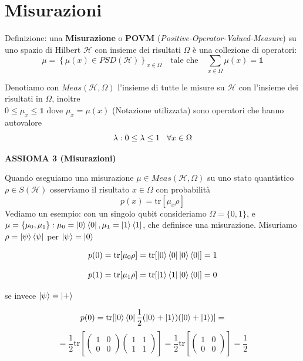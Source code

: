 \documentclass{report}
\begin{document}
\section{Misurazioni}
Definizione: una \textbf{Misurazione} o \textbf{POVM} (\textit{Positive-Operator-Valued-Measure}) su uno spazio di Hilbert $\mathcal{H}$ con insieme dei risultati $\Omega$ è una collezione di operatori:
$$\mu=\left\{ \mu(x) \in \textit{PSD}(\mathcal{H}) \right\}_{x\in\Omega}\quad \text{tale che}\quad \sum_{x\in\Omega} \mu(x) = \mathbb{1}$$

Denotiamo con $\textit{Meas}(\mathcal{H},\Omega)$ l'insieme di tutte le misure su $\mathcal{H}$ con l'insieme dei risultati in $\Omega$, inoltre\\ $0\le\mu_x\le\mathbb{1}$ dove $\mu_x=\mu(x)$ 
(Notazione utilizzata) sono operatori che hanno autovalore $$\lambda:0\le\lambda\le1 \hspace{0.3cm} \forall x \in \Omega$$

\textbf{ASSIOMA 3 (Misurazioni)}

Quando eseguiamo una misurazione $\mu\in \textit{Meas}(\mathcal{H},\Omega)$ su uno stato quantistico $\rho\in S(\mathcal{H})$ osserviamo il risultato $x\in \Omega$ con probabilità $$p(x) = \text{tr}[\mu_x\rho]$$
Vediamo un esempio: con un singolo qubit consideriamo $\Omega= \{0,1\}$, e
$\mu=\{\mu_0,\mu_1\}:\mu_0=\ket{0}\bra{0},\mu_1=\ket{1}\bra{1}$, che definisce una misurazione. Misuriamo $\rho = \ket{\psi}\bra{\psi}$ per $\ket{\psi} = \ket{0}$

$$
    p(0)=\text{tr}[\mu_0\rho]=\text{tr}[\ket{0}\bra{0}\ket{0}\bra{0}] = 1
$$

$$
    p(1)=\text{tr}[\mu_1\rho]=\text{tr}[\ket{1}\bra{1}\ket{0}\bra{0}] = 0
$$

se invece $\ket{\psi} = \ket{+}$

$$
    p(0) = \text{tr}[\ket{0}\bra{0}\frac{1}{2}(\ket{0}+\ket{1})(\ket{0}+\ket{1})] = 
$$
$$
    = \frac{1}{2} \text{tr}\left[
    \begin{pmatrix}
        1 & 0\\
        0 & 0
    \end{pmatrix}
    \begin{pmatrix}
        1 & 1\\
        1 & 1
    \end{pmatrix}
    \right]
     = 
     \frac{1}{2} \text{tr}\left[
    \begin{pmatrix}
        1 & 0\\
        0 & 0
    \end{pmatrix}\right] = \frac{1}{2}
$$
\end{document}
